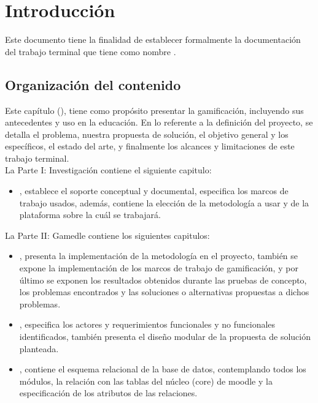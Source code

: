 \chapter{Introducción}
\label{ch:introduccion}

Este documento tiene la finalidad de establecer formalmente la documentación del trabajo terminal {\numeroTT} que tiene como nombre {\bf\tituloTT}.

\section{Organización del contenido}

 Este capítulo (), tiene como propósito presentar la gamificación, incluyendo sus antecedentes y uso en la educación. En lo referente a la definición del proyecto, se detalla el problema, nuestra propuesta de solución, el objetivo general y los específicos, el estado del arte, y finalmente los alcances y limitaciones de este trabajo terminal.\\

 \noindent La {\pf Parte I: Investigación} contiene el siguiente capitulo:%

    \begin{itemize}
        \item {}, establece el soporte conceptual y documental,
        especifica los marcos de trabajo usados, además, contiene la elección de la
        metodología a usar y de la plataforma sobre la cuál se trabajará.

    \end{itemize}

\noindent La {\pf Parte II: Gamedle} contiene los siguientes capitulos:%

\begin{itemize}

    \item {}, presenta la implementación de la metodología en el proyecto,
    también se expone la implementación de los marcos de trabajo de gamificación, y por último
    se exponen los resultados obtenidos durante las pruebas de concepto, los problemas encontrados
    y las soluciones o alternativas propuestas a dichos problemas.

    \item {}, especifica los actores y requerimientos funcionales
    y no funcionales identificados, también presenta el diseño modular de la propuesta
    de solución planteada.

    \item {}, contiene el esquema relacional de la base de
    datos, contemplando todos los módulos, la relación con las tablas del núcleo (core)
    de moodle y la especificación de los atributos de las relaciones.
\end{itemize}

